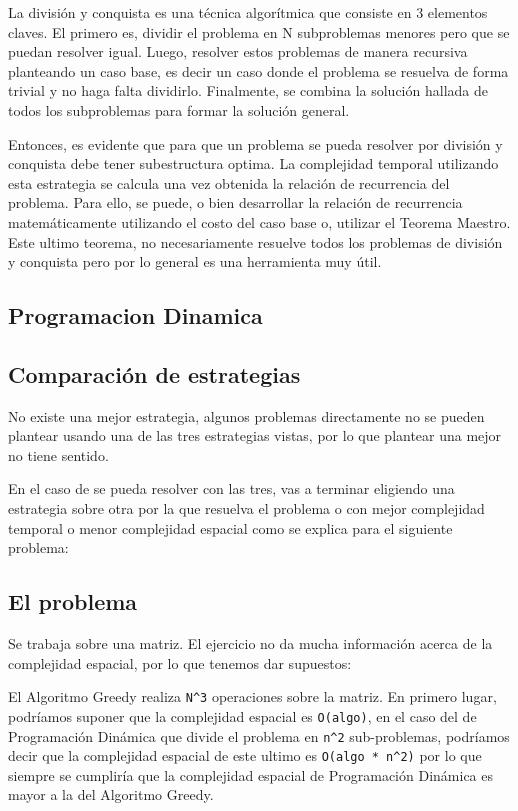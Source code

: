 \documentclass[titlepage,a4paper]{article}
\begin{document}
La división y conquista es una técnica algorítmica que consiste en 3 elementos
claves. El primero es, dividir el problema en N subproblemas menores pero que se
puedan resolver igual. Luego, resolver estos problemas de manera recursiva
planteando un caso base, es decir un caso donde el problema se resuelva de forma
trivial y no haga falta dividirlo. Finalmente, se combina la solución hallada de
todos los subproblemas para formar la solución general.

Entonces, es evidente que para que un problema se pueda resolver por división y
conquista debe tener subestructura optima. La complejidad temporal utilizando
esta estrategia se calcula una vez obtenida la relación de recurrencia del
problema. Para ello, se puede, o bien desarrollar la relación de recurrencia
matemáticamente utilizando el costo del caso base o, utilizar el Teorema
Maestro. Este ultimo teorema, no necesariamente resuelve todos los problemas de
división y conquista pero por lo general es una herramienta muy útil.

\subsection{Programacion Dinamica}
\label{sec:orgda26241}

\subsection{Comparación de estrategias}
\label{sec:orgf5e9d44}

No existe una mejor estrategia, algunos problemas directamente no se pueden
plantear usando una de las tres estrategias vistas, por lo que plantear una
mejor no tiene sentido.

En el caso de se pueda resolver con las tres, vas a terminar eligiendo una
estrategia sobre otra por la que resuelva el problema o con mejor complejidad
temporal o menor complejidad espacial como se explica para el siguiente problema:

\subsection{El problema}
\label{sec:org92ce2af}

Se trabaja sobre una matriz. El ejercicio no da mucha información acerca de la
complejidad espacial, por lo que tenemos dar supuestos:

El Algoritmo Greedy realiza \texttt{N\textasciicircum{}3} operaciones sobre la matriz. En primero lugar,
podríamos suponer que la complejidad espacial es \texttt{O(algo)}, en el caso del de
Programación Dinámica que divide el problema en \texttt{n\textasciicircum{}2} sub-problemas, podríamos
decir que la complejidad espacial de este ultimo es \texttt{O(algo * n\textasciicircum{}2)} por lo que
siempre se cumpliría que la complejidad espacial de Programación Dinámica es
mayor a la del Algoritmo Greedy.
\end{document}
